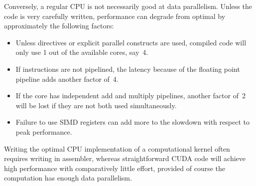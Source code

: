 Conversely, a regular CPU is not necessarily good at data
parallelism. Unless the code is very carefully written, performance
can degrade from optimal by approximately the following factors:
\begin{itemize}
\item Unless directives or explicit parallel constructs are used,
  compiled code will only use 1 out of the available cores, say~4.
\item If instructions are not pipelined, the latency because of the
  floating point pipeline adds another factor of~4.
\item If the core has independent add and multiply pipelines, another
  factor of~2 will be lost if they are not both used simultaneously.
\item Failure to use SIMD registers can add more to the slowdown with
  respect to peak performance.
\end{itemize}
Writing the optimal CPU implementation of a computational kernel often
requires writing in assembler, whereas straightforward CUDA code will
achieve high performance with comparatively little effort, provided of
course the computation has enough data parallelism.

\endinput
Each SM has a 8192 entry register file = 32Kbyte,
on the other hand, shared memory on the SM is only 16Kbyte

A kernel is spawned on a (1d,2d) \emph{grid} of (1d,2d,3d) 
\emph{thread blocks}. 
Within a thread block:
- synchronization
- data sharing
Different thread blocks can not cooperate or synchronize.

Identification:
- block ID (1d,2d)
- thread ID (1d,2d,3d)

Memory
- per thread registers and local memory
- per block shared memory
- per grid global memory, r/o constant memory, r/o texture memory
The host can r/w global/constant/texture memory


